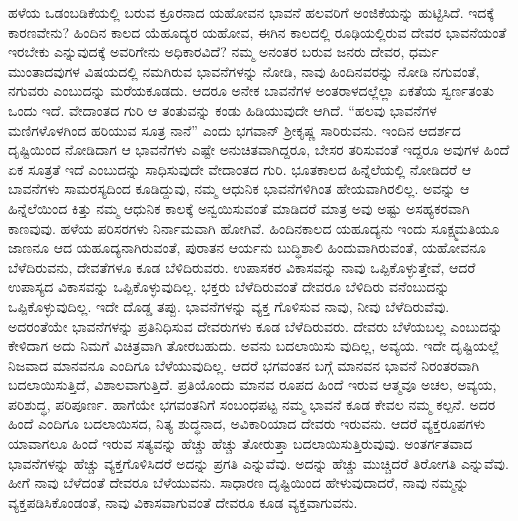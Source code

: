 ಹಳೆಯ ಒಡಂಬಡಿಕೆಯಲ್ಲಿ ಬರುವ ಕ್ರೂರನಾದ ಯಹೋವನ ಭಾವನೆ ಹಲವರಿಗೆ ಅಂಜಿಕೆಯನ್ನು ಹುಟ್ಟಿಸಿದೆ. ಇದಕ್ಕೆ ಕಾರಣವೇನು? ಹಿಂದಿನ ಕಾಲದ ಯೆಹೂದ್ಯರ ಯಹೋವ, ಈಗಿನ ಕಾಲದಲ್ಲಿ ರೂಢಿಯಲ್ಲಿರುವ ದೇವರ ಭಾವನೆಯಂತೆ ಇರಬೇಕು ಎನ್ನುವುದಕ್ಕೆ ಅವರಿಗೇನು ಅಧಿಕಾರವಿದೆ? ನಮ್ಮ ಅನಂತರ ಬರುವ ಜನರು ದೇವರ, ಧರ್ಮ ಮುಂತಾದವುಗಳ ವಿಷಯದಲ್ಲಿ ನಮಗಿರುವ ಭಾವನೆಗಳನ್ನು ನೋಡಿ, ನಾವು ಹಿಂದಿನವರನ್ನು ನೋಡಿ ನಗುವಂತೆ, ನಗುವರು ಎಂಬುದನ್ನು ಮರೆಯಕೂಡದು. ಆದರೂ ಅನೇಕ ಬಾವನೆಗಳ ಅಂತರಾಳದಲ್ಲೆಲ್ಲಾ ಏಕತೆಯ ಸ್ವರ್ಣತಂತು ಒಂದು ಇದೆ. ವೇದಾಂತದ ಗುರಿ ಆ ತಂತುವನ್ನು ಕಂಡು ಹಿಡಿಯುವುದೇ ಆಗಿದೆ. “ಹಲವು ಭಾವನೆಗಳ ಮಣಿಗಳೊಳಗಿಂದ ಹರಿಯುವ ಸೂತ್ರ ನಾನೆ” ಎಂದು ಭಗವಾನ್​ ಶ‍್ರೀಕೃಷ್ಣ ಸಾರಿರುವನು. ಇಂದಿನ ಆದರ್ಶದ ದೃಷ್ಟಿಯಿಂದ ನೋಡಿದಾಗ ಆ ಭಾವನೆಗಳು ಎಷ್ಟೇ ಅನುಚಿತವಾಗಿದ್ದರೂ, ಬೇಸರ ತರಿಸುವಂತೆ ಇದ್ದರೂ ಅವುಗಳ ಹಿಂದೆ ಏಕ ಸೂತ್ರತೆ ಇದೆ ಎಂಬುದನ್ನು ಸಾಧಿಸುವುದೇ ವೇದಾಂತದ ಗುರಿ. ಭೂತಕಾಲದ ಹಿನ್ನೆಲೆಯಲ್ಲಿ ನೋಡಿದರೆ ಆ ಬಾವನೆಗಳು ಸಾಮರಸ್ಯದಿಂದ ಕೂಡಿದ್ದುವು, ನಮ್ಮ ಆಧುನಿಕ ಭಾವನೆಗಳಿಗಿಂತ ಹೇಯವಾಗಿರಲಿಲ್ಲ. ಅವನ್ನು ಆ ಹಿನ್ನೆಲೆಯಿಂದ ಕಿತ್ತು ನಮ್ಮ ಆಧುನಿಕ ಕಾಲಕ್ಕೆ ಅನ್ವಯಿಸುವಂತೆ ಮಾಡಿದರೆ ಮಾತ್ರ ಅವು ಅಷ್ಟು ಅಸಹ್ಯಕರವಾಗಿ ಕಾಣವುವು. ಹಳೆಯ ಪರಿಸರಗಳು ನಿರ್ನಾಮವಾಗಿ ಹೋಗಿವೆ. ಹಿಂದಿನಕಾಲದ ಯಹೂದ್ಯನು ಇಂದು ಸೂಕ್ಷ್ಮಮತಿಯೂ ಜಾಣನೂ ಆದ ಯಹೂದ್ಯನಾಗಿರುವಂತೆ, ಪುರಾತನ ಆರ್ಯನು ಬುದ್ಧಿಶಾಲಿ ಹಿಂದುವಾಗಿರುವಂತೆ, ಯಹೋವನೂ ಬೆಳೆದಿರುವನು, ದೇವತೆಗಳೂ ಕೂಡ ಬೆಳಿದಿರುವರು. ಉಪಾಸಕರ ವಿಕಾಸವನ್ನು ನಾವು ಒಪ್ಪಿಕೊಳ್ಳುತ್ತೇವೆ, ಆದರೆ ಉಪಾಸ್ಯದ ವಿಕಾಸವನ್ನು ಒಪ್ಪಿಕೊಳ್ಳುವುದಿಲ್ಲ. ಭಕ್ತರು ಬೆಳೆದಿರುವಂತೆ ದೇವರೂ ಬೆಳಿದಿರು ವನೆಂಬುದನ್ನು ಒಪ್ಪಿಕೊಳ್ಳುವುದಿಲ್ಲ. ಇದೇ ದೊಡ್ಡ ತಪ್ಪು. ಭಾವನೆಗಳನ್ನು ವ್ಯಕ್ತ ಗೊಳಿಸುವ ನಾವು, ನೀವು ಬೆಳೆದಿರುವೆವು. ಅದರಂತೆಯೇ ಭಾವನೆಗಳನ್ನು ಪ್ರತಿನಿಧಿಸುವ ದೇವರುಗಳು ಕೂಡ ಬೆಳೆದಿರುವರು. ದೇವರು ಬೆಳೆಯಬಲ್ಲ ಎಂಬುದನ್ನು ಕೇಳಿದಾಗ ಅದು ನಿಮಗೆ ವಿಚಿತ್ರವಾಗಿ ತೋರಬಹುದು. ಅವನು ಬದಲಾಯಿಸು ವುದಿಲ್ಲ, ಅವ್ಯಯ. ಇದೇ ದೃಷ್ಟಿಯಲ್ಲೆ ನಿಜವಾದ ಮಾನವನೂ ಎಂದಿಗೂ ಬೆಳೆಯುವುದಿಲ್ಲ. ಆದರೆ ಭಗವಂತನ ಬಗ್ಗೆ ಮಾನವನ ಭಾವನೆ ನಿರಂತರವಾಗಿ ಬದಲಾಯಿಸುತ್ತಿದೆ, ವಿಶಾಲವಾಗುತ್ತಿದೆ. ಪ್ರತಿಯೊಂದು ಮಾನವ ರೂಪದ ಹಿಂದೆ ಇರುವ ಆತ್ಮವೂ ಅಚಲ, ಅವ್ಯಯ, ಪರಿಶುದ್ಧ, ಪರಿಪೂರ್ಣ. ಹಾಗೆಯೇ ಭಗವಂತನಿಗೆ ಸಂಬಂಧಪಟ್ಟ ನಮ್ಮ ಭಾವನೆ ಕೂಡ ಕೇವಲ ನಮ್ಮ ಕಲ್ಪನೆ. ಅದರ ಹಿಂದೆ ಎಂದಿಗೂ ಬದಲಾಯಿಸದ, ನಿತ್ಯ ಶುದ್ಧನಾದ, ಅವಿಕಾರಿಯಾದ ದೇವರು ಇರುವನು. ಆದರೆ ವ್ಯಕ್ತರೂಪಗಳು ಯಾವಾಗಲೂ ಹಿಂದೆ ಇರುವ ಸತ್ಯವನ್ನು ಹೆಚ್ಚು ಹೆಚ್ಚು ತೋರುತ್ತಾ ಬದಲಾಯಿಸುತ್ತಿರುವುವು. ಅಂತರ್ಗತವಾದ ಭಾವನೆಗಳನ್ನು ಹೆಚ್ಚು ವ್ಯಕ್ತಗೊಳಿಸಿದರೆ ಅದನ್ನು ಪ್ರಗತಿ ಎನ್ನುವೆವು. ಅದನ್ನು ಹೆಚ್ಚು ಮುಚ್ಚಿದರೆ ತಿರೋಗತಿ ಎನ್ನುವೆವು. ಹೀಗೆ ನಾವು ಬೆಳೆದಂತೆ ದೇವರೂ ಬೆಳೆಯುವನು. ಸಾಧಾರಣ ದೃಷ್ಟಿಯಿಂದ ಹೇಳುವುದಾದರೆ, ನಾವು ನಮ್ಮನ್ನು ವ್ಯಕ್ತಪಡಿಸಿಕೊಂಡಂತೆ, ನಾವು ವಿಕಾಸವಾಗುವಂತೆ ದೇವರೂ ಕೂಡ ವ್ಯಕ್ತವಾಗುವನು.

